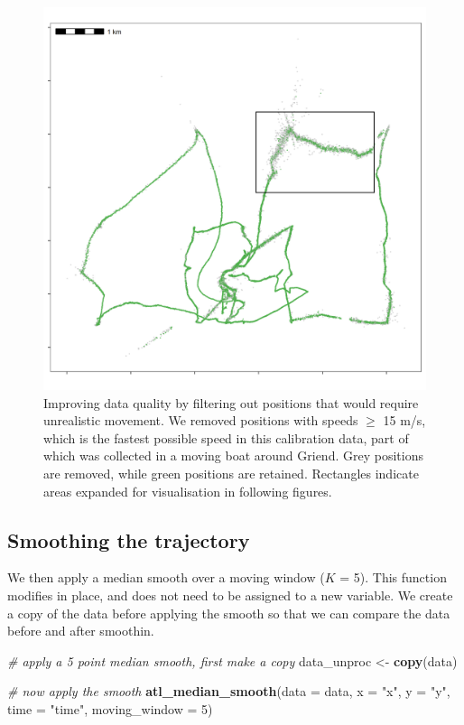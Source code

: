 \documentclass[
]{scrartcl}
\newenvironment{Shaded}{}{}
\newcommand{\CommentTok}[1]{\textcolor[rgb]{0.38,0.63,0.69}{\textit{#1}}}
\newcommand{\DataTypeTok}[1]{\textcolor[rgb]{0.56,0.13,0.00}{#1}}
\newcommand{\DecValTok}[1]{\textcolor[rgb]{0.25,0.63,0.44}{#1}}
\newcommand{\KeywordTok}[1]{\textcolor[rgb]{0.00,0.44,0.13}{\textbf{#1}}}
\newcommand{\NormalTok}[1]{#1}
\newcommand{\StringTok}[1]{\textcolor[rgb]{0.25,0.44,0.63}{#1}}
\begin{document}
\begin{figure}
\centering
\includegraphics{figures/fig_speed_outlier.png}
\caption{Improving data quality by filtering out positions that would require unrealistic movement. We removed positions with speeds \(\geq\) 15 m/s, which is the fastest possible speed in this calibration data, part of which was collected in a moving boat around Griend. Grey positions are removed, while green positions are retained. Rectangles indicate areas expanded for visualisation in following figures.}
\end{figure}

\hypertarget{smoothing-the-trajectory}{%
\subsection{Smoothing the trajectory}\label{smoothing-the-trajectory}}

We then apply a median smooth over a moving window (\(K\) = 5).
This function modifies in place, and does not need to be assigned to a new variable.
We create a copy of the data before applying the smooth so that we can compare the data before and after smoothin.

\begin{Shaded}
\begin{Highlighting}[]
\CommentTok{\# apply a 5 point median smooth, first make a copy}
\NormalTok{data\_unproc <{-}}\StringTok{ }\KeywordTok{copy}\NormalTok{(data)}

\CommentTok{\# now apply the smooth}
\KeywordTok{atl\_median\_smooth}\NormalTok{(}\DataTypeTok{data =}\NormalTok{ data,}
                  \DataTypeTok{x =} \StringTok{"x"}\NormalTok{, }\DataTypeTok{y =} \StringTok{"y"}\NormalTok{, }\DataTypeTok{time =} \StringTok{"time"}\NormalTok{,}
                  \DataTypeTok{moving\_window =} \DecValTok{5}\NormalTok{)}
\end{Highlighting}
\end{Shaded}
\end{document}
